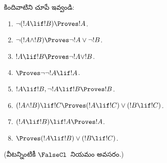 \documentclass[../../../include/open-logic-section]{subfiles}
\begin{document}
\begin{prob}
కిందివాటిని చూపే  ఇవ్వండి:
\begin{enumerate}
\item $\lnot(!A \lif !B) \Proves !A$.
\item $\lnot(!A \land !B) \Proves \lnot !A \lor \lnot !B$.
\item $!A \lif !B \Proves \lnot !A \lor !B$.
\item $\Proves \lnot \lnot !A \lif !A$.
\item $!A \lif !B, \lnot !A \lif !B \Proves !B$.
\item $(!A \land !B) \lif !C \Proves (!A \lif !C) \lor (!B \lif !C)$.
\item $(!A \lif !B) \lif !A \Proves !A$.
\item $\Proves (!A \lif !B) \lor (!B \lif !C)$.
\end{enumerate}
(వీటన్నింటికీ $\FalseCl$~నియమం అవసరం.)
\end{prob}
\end{document}
